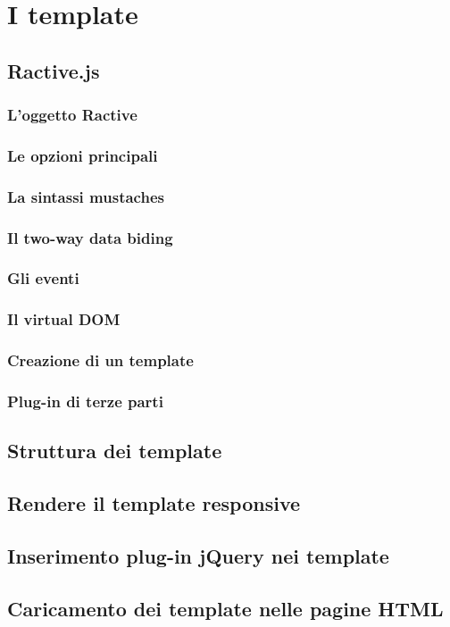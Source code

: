 
\chapter{I template}
\label{cap:template}
\section{Ractive.js}

\subsection{L'oggetto Ractive}

\subsection{Le opzioni principali}

\subsection{La sintassi mustaches}

\subsection{Il two-way data biding}

\subsection{Gli eventi}

\subsection{Il virtual DOM}

\subsection{Creazione di un template}

\subsection{Plug-in di terze parti}\label{sec:packager}

\section{Struttura dei template}

\section{Rendere il template responsive}

\section{Inserimento plug-in jQuery nei template}

\section{Caricamento dei template nelle pagine HTML}

